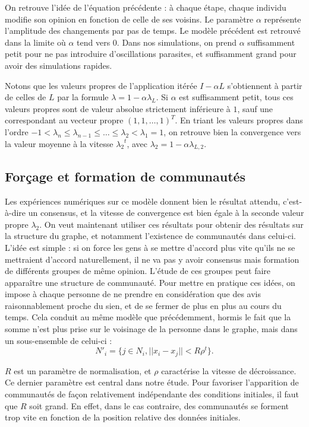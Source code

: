 \documentclass[12pt]{article}
\begin{document}
On retrouve l'idée de l'équation précédente : à chaque étape, chaque
individu modifie son opinion en fonction de celle de ses voisins. Le
paramètre $\alpha$ représente l'amplitude des changements par pas de
temps. Le modèle précédent est retrouvé dans la limite où $\alpha$
tend vers 0. Dans nos simulations, on prend $\alpha$ suffisamment
petit pour ne pas introduire d'oscillations parasites, et suffisamment
grand pour avoir des simulations rapides.

Notons que les valeurs propres de l'application itérée $I - \alpha L$
s'obtiennent à partir de celles de $L$ par la formule $\lambda = 1 -
\alpha \lambda_L$. Si $\alpha$ est suffisamment petit, tous ces
valeurs propres sont de valeur absolue strictement inférieure à $1$,
sauf une correspondant au vecteur propre $(1, 1, \dots, 1)^T$. En
triant les valeurs propres dans l'ordre $-1 < \lambda_n \leq
\lambda_{n-1} \leq \dots \leq \lambda_2 < \lambda_1 = 1$, on
retrouve bien la convergence vers la valeur moyenne à la vitesse
${\lambda_2}^t$, avec $\lambda_2 = 1 - \alpha \lambda_{L,2}$.

\subsection{Forçage et formation de communautés}
\label{forçage}
Les expériences numériques sur ce modèle donnent bien le résultat
attendu, c'est-à-dire un consensus, et la vitesse de convergence est
bien égale à la seconde valeur propre $\lambda_2$. On veut maintenant
utiliser ces résultats pour obtenir des résultats sur la structure du
graphe, et notamment l'existence de communautés dans celui-ci. L'idée
est simple : si on force les gens à se mettre d'accord plus vite
qu'ils ne se mettraient d'accord naturellement, il ne va pas y avoir
consensus mais formation de différents groupes de même
opinion. L'étude de ces groupes peut faire apparaître une structure de
communauté. Pour mettre en pratique ces idées, on impose à chaque
personne de ne prendre en considération que des avis raisonnablement
proche du sien, et de se fermer de plus en plus au cours du
temps. Cela conduit au même modèle que précédemment, hormis le fait que la
somme n'est plus prise sur le voisinage de la personne dans le graphe,
mais dans un sous-ensemble de celui-ci : $$N'_{i} = \{j \in N_i, ||x_i
- x_j|| < R \rho^t\}.$$

$R$ est un paramètre de normalisation, et $\rho$ caractérise la vitesse de
décroissance. Ce dernier paramètre est central dans notre étude. Pour
favoriser l'apparition de communautés de façon relativement indépendante des
conditions initiales, il faut que $R$ soit grand. En effet, dans le cas
contraire, des communautés se forment trop vite en fonction de la position
relative des données initiales.
\end{document}

